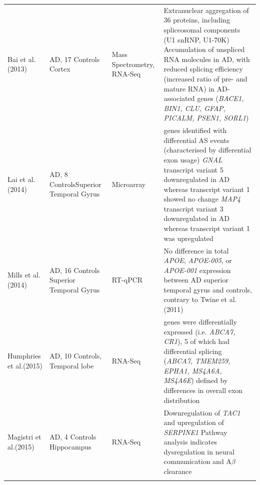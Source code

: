 \begin{changemargin}{1.5cm}
\begin{landscape}
\begin{longtable}[c]{p{3cm}p{4cm}p{3cm}p{16cm}}
			\centering Bai et al. \newline(2013)\cite{Bai2013} &
			\centering 18 AD, 17 Controls \newline Cortex &
			\centering Mass Spectrometry, RNA-Seq &
			\tabitem Extranuclear aggregation of 36 proteins, including spliceosomal components (U1 snRNP, U1-70K) \newline
			\tabitem Accumulation of unspliced RNA molecules in AD, with reduced splicing efficiency (increased ratio of pre- and mature RNA) in AD-associated genes (\textit{BACE1, BIN1, CLU, GFAP, PICALM, PSEN1, SORL1})  \\
			\hdashline[0.5pt/5pt]
			
			\centering  Lai et al. \newline(2014)\cite{Lai2014} &
			\centering 8 AD, 8 Controls\newline Superior Temporal Gyrus &
			\centering Microarray &
			\tabitem 22 genes identified with differential AS events (characterised by differential exon usage) \newline  
			\tabitem \textit{GNAL} transcript variant 5 downregulated in AD whereas transcript variant 1 showed no change \newline 
			\tabitem \textit{MAP4} transcript variant 3 downregulated in AD whereas transcript variant 1 was upregulated\\
			\hdashline[0.5pt/5pt]
			
			\centering Mills et al. (2014)\cite{Mills2014} &
			\centering 14 AD, 16 Controls \newline Superior Temporal Gyrus &
			\centering RT-qPCR &
			\tabitem No difference in total \textit{APOE}, \textit{APOE-005}, or \textit{APOE-001} expression between AD superior temporal gyrus and controls, contrary to Twine et al. (2011)\cite{Twine2011} \\
			
			\centering Humphries et al.(2015)\cite{Humphries2015} &
			\centering 10 AD, 10 Controls, \newline Temporal lobe &
			\centering RNA-Seq &
			\tabitem 9 genes were differentially expressed (i.e. \textit{ABCA7, CR1}), 5 of which had differential splicing (\textit{ABCA7, TMEM259, EPHA1, MS4A6A, MS4A6E}) defined by differences in overall exon distribution \\
			\hdashline[0.5pt/5pt]
			
			\centering Magistri et al.(2015)\cite{Magistri2015} &
			\centering 4 AD, 4 Controls \newline Hippocampus &
			\centering RNA-Seq &
			\tabitem Downregulation of \textit{TAC1} and upregulation of \textit{SERPINE1} \newline 
			\tabitem Pathway analysis indicates dysregulation in neural communication and A$\beta$ clearance \\		
			\hdashline[0.5pt/5pt]
			

\end{longtable}
\end{landscape}
\end{changemargin}
